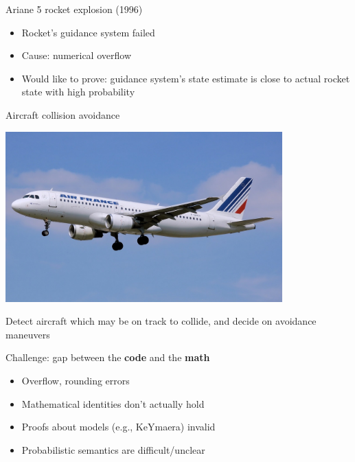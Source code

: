 \documentclass[14pt]{beamer}
\begin{document}
\begin{frame}{Ariane 5 rocket explosion (1996)}

\begin{itemize}
\item Rocket's guidance system failed
\bigskip
\item Cause: numerical overflow
\bigskip
\item Would like to prove: guidance system's state estimate is close to actual rocket state with high probability
\end{itemize}
\end{frame}

\begin{frame}{Aircraft collision avoidance}
\begin{center}
\includegraphics[width=0.8\textwidth]{images/airplane.jpg}
\end{center}

Detect aircraft which may be on track to collide, and decide on avoidance maneuvers
\end{frame}

\begin{frame}
\begin{center}
\huge Challenge: gap between the \textbf{code} and the \textbf{math}
\end{center}

\bigskip
\pause 
\begin{itemize}
  \item Overflow, rounding errors
  \item Mathematical identities don't actually hold
  \item Proofs about models (e.g., KeYmaera) invalid
  \item Probabilistic semantics are difficult/unclear
\end{itemize}
\end{frame}
\end{document}
